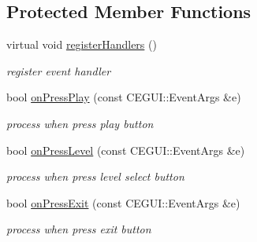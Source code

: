 \subsection*{Protected Member Functions}
\begin{DoxyCompactItemize}
\item 
virtual void \hyperlink{class_n_c_t_u_1_1_main_menu_window_ac18c70de0ddc81dedaf67f9741631745}{register\+Handlers} ()\hypertarget{class_n_c_t_u_1_1_main_menu_window_ac18c70de0ddc81dedaf67f9741631745}{}\label{class_n_c_t_u_1_1_main_menu_window_ac18c70de0ddc81dedaf67f9741631745}

\begin{DoxyCompactList}\small\item\em register event handler \end{DoxyCompactList}\item 
bool \hyperlink{class_n_c_t_u_1_1_main_menu_window_a41c92268b6622f62daf0838a62c01b48}{on\+Press\+Play} (const C\+E\+G\+U\+I\+::\+Event\+Args \&e)\hypertarget{class_n_c_t_u_1_1_main_menu_window_a41c92268b6622f62daf0838a62c01b48}{}\label{class_n_c_t_u_1_1_main_menu_window_a41c92268b6622f62daf0838a62c01b48}

\begin{DoxyCompactList}\small\item\em process when press play button \end{DoxyCompactList}\item 
bool \hyperlink{class_n_c_t_u_1_1_main_menu_window_a05b6e1700030580fd935263e5758f415}{on\+Press\+Level} (const C\+E\+G\+U\+I\+::\+Event\+Args \&e)\hypertarget{class_n_c_t_u_1_1_main_menu_window_a05b6e1700030580fd935263e5758f415}{}\label{class_n_c_t_u_1_1_main_menu_window_a05b6e1700030580fd935263e5758f415}

\begin{DoxyCompactList}\small\item\em process when press level select button \end{DoxyCompactList}\item 
bool \hyperlink{class_n_c_t_u_1_1_main_menu_window_aca5070bca956bd79efd73dd05e460784}{on\+Press\+Exit} (const C\+E\+G\+U\+I\+::\+Event\+Args \&e)\hypertarget{class_n_c_t_u_1_1_main_menu_window_aca5070bca956bd79efd73dd05e460784}{}\label{class_n_c_t_u_1_1_main_menu_window_aca5070bca956bd79efd73dd05e460784}

\begin{DoxyCompactList}\small\item\em process when press exit button \end{DoxyCompactList}\end{DoxyCompactItemize}
